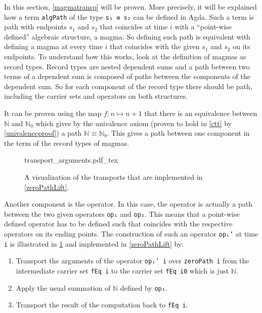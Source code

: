 \documentclass[12pt,a4paper,twoside,xetex]{book} %
\newcommand{\incfig}[1]{%
    \def\svgwidth{0.6\columnwidth}
    {#1.pdf_tex}
}
\begin{document}
In this section, \cref{magmatransp} will be proven. More precisely, it will be explained how a term \texttt{algPath} of the type \texttt{s₁ ≡ s₂} can be defined in Agda. Such a term is path with endpoints $s_1$ and $s_2$ that coincides at time $i$ with a ``point-wise 
defined'' algebraic structure, a magma. So defining such path is equivalent 
with defining a magma at every time $i$ that coincides with the given $s_1$ and 
$s_2$ on its endpoints. To understand how this works, look at the definition of 
magmas as record types. Record types are nested dependent sums and a path 
between two terms of a dependent sum is composed of paths between the 
components of the dependent sum. So for each component of the record type there 
should be path, including the carrier sets and operators on both structures. 

It can be proven using the map $f: n \mapsto n + 1$ that there is an 
equivalence between $\mathbb{N}$ and $\mathbb{N}_0$ which gives by the 
univalence axiom (proven to hold in \cref{ctt} by \cref{univalenceproof}) a 
path $\texttt{ℕ ≡ ℕ₀}$. This gives a path between one component in the term of 
the record types of magmas. 

\begin{figure}\label{transpop}
\centering
\incfig{transport_arguments}
\caption{A visualization of the transports that are implemented in \cref{zeroPathLift}.}
\end{figure}

Another component is the operator. In this case, the operator is actually a 
path between the two given operators \texttt{op₁} and \texttt{op₂}. This means that a point-wise defined 
operator has to be defined such that coincides with the respective operators on its ending points. The construction of such an operator \texttt{opᵢ'} at time \texttt{i} is illustrated in \cref{transpop} and implemented in \cref{zeroPathLift} by:

\begin{enumerate}
\item Transport the arguments of the operator \texttt{opᵢ' i} over \texttt{zeroPath i} from the intermediate carrier set \texttt{fEq i} to the carrier set \texttt{fEq i0} which is just $\mathbb{N}$. 
\item Apply the usual summation of $\mathbb{N}$ defined by \texttt{op₁}.
\item Transport the result of the computation back to \texttt{fEq i}.
\end{enumerate}
\end{document}
